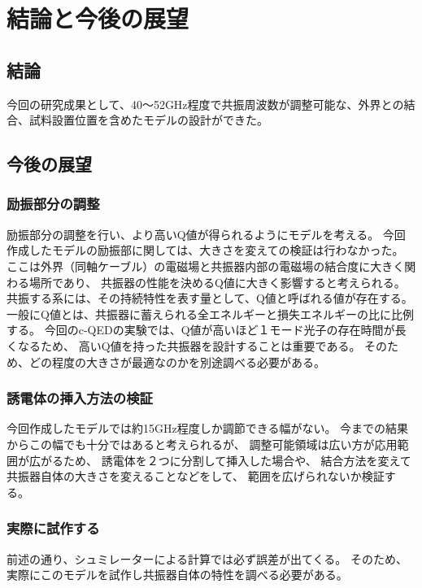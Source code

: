 \chapter{結論と今後の展望}
\section{結論}
今回の研究成果として、40〜52GHz程度で共振周波数が調整可能な、外界との結合、試料設置位置を含めたモデルの設計ができた。

\section{今後の展望}

\subsection*{励振部分の調整}
励振部分の調整を行い、より高いQ値が得られるようにモデルを考える。
今回作成したモデルの励振部に関しては、大きさを変えての検証は行わなかった。
ここは外界（同軸ケーブル）の電磁場と共振器内部の電磁場の結合度に大きく関わる場所であり、
共振器の性能を決めるQ値に大きく影響すると考えられる。
共振する系には、その持続特性を表す量として、Q値と呼ばれる値が存在する。
一般にQ値とは、共振器に蓄えられる全エネルギーと損失エネルギーの比に比例する。
今回のc-QEDの実験では、Q値が高いほど１モード光子の存在時間が長くなるため、
高いQ値を持った共振器を設計することは重要である。
そのため、どの程度の大きさが最適なのかを別途調べる必要がある。

\subsection*{誘電体の挿入方法の検証}
今回作成したモデルでは約15GHz程度しか調節できる幅がない。
今までの結果からこの幅でも十分ではあると考えられるが、
調整可能領域は広い方が応用範囲が広がるため、
誘電体を２つに分割して挿入した場合や、
結合方法を変えて共振器自体の大きさを変えることなどをして、
範囲を広げられないか検証する。

\subsection*{実際に試作する}
前述の通り、シュミレーターによる計算では必ず誤差が出てくる。
そのため、実際にこのモデルを試作し共振器自体の特性を調べる必要がある。
